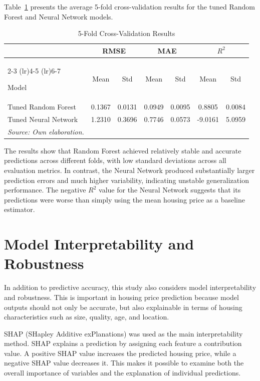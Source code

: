 \documentclass[12pt,a4paper,oneside,openany]{book}
\begin{document}
Table~\ref{tab:cv_results} presents the average 5-fold cross-validation results for the tuned Random Forest and Neural Network models.

\begin{table}[H]
\centering
\caption{5-Fold Cross-Validation Results}
\label{tab:cv_results}

\begin{tabular}{lcccccc}
\toprule
& \multicolumn{2}{c}{RMSE} 
& \multicolumn{2}{c}{MAE} 
& \multicolumn{2}{c}{$R^2$} \\

\cmidrule(lr){2-3}
\cmidrule(lr){4-5}
\cmidrule(lr){6-7}

Model & Mean & Std & Mean & Std & Mean & Std \\
\midrule

Tuned Random Forest 
& 0.1367 & 0.0131 
& 0.0949 & 0.0095 
& 0.8805 & 0.0084 \\

Tuned Neural Network 
& 1.2310 & 0.3696 
& 0.7746 & 0.0573 
& -9.0161 & 5.0959 \\

\bottomrule
\textit{Source: Own elaboration.}
\end{tabular}
\end{table}

The results show that Random Forest achieved relatively stable and accurate predictions across different folds, with low standard deviations across all evaluation metrics. In contrast, the Neural Network produced substantially larger prediction errors and much higher variability, indicating unstable generalization performance. The negative $R^2$ value for the Neural Network suggests that its predictions were worse than simply using the mean housing price as a baseline estimator.


\section{Model Interpretability and Robustness}

In addition to predictive accuracy, this study also considers model interpretability and robustness. This is important in housing price prediction because model outputs should not only be accurate, but also explainable in terms of housing characteristics such as size, quality, age, and location.

SHAP (SHapley Additive exPlanations) was used as the main interpretability method. SHAP explains a prediction by assigning each feature a contribution value. A positive SHAP value increases the predicted housing price, while a negative SHAP value decreases it. This makes it possible to examine both the overall importance of variables and the explanation of individual predictions.
\end{document}
